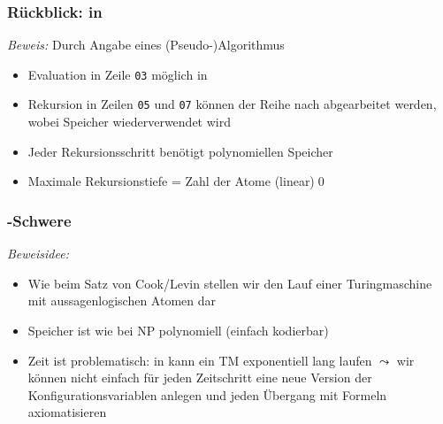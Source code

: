 \documentclass[aspectratio=1610,onlymath]{beamer}
\begin{document}
\begin{frame}\frametitle{Rückblick:  in \PSpace}

\pause

\emph{Beweis:} Durch Angabe eines (Pseudo-)Algorithmus

\smallskip

\begin{itemize}
\item Evaluation in Zeile \texttt{03} möglich in \PSpace
\item Rekursion in Zeilen \texttt{05} und \texttt{07} können der Reihe nach abgearbeitet werden, wobei Speicher wiederverwendet wird
\item Jeder Rekursionsschritt benötigt polynomiellen Speicher
\item Maximale Rekursionstiefe = Zahl der Atome (linear)\qed
\end{itemize}


\end{frame}

\begin{frame}\frametitle{\PSpace-Schwere}

\bigskip\pause

\pause

\emph{Beweisidee:}
\begin{itemize}
\item Wie beim Satz von Cook/Levin stellen wir den Lauf einer Turingmaschine
mit aussagenlogischen Atomen dar
\item Speicher ist wie bei NP polynomiell (einfach kodierbar)
\item Zeit ist problematisch: in \PSpace kann ein TM exponentiell lang laufen
$\leadsto$ wir können nicht einfach für jeden Zeitschritt eine neue Version
der Konfigurationsvariablen anlegen und jeden Übergang mit Formeln axiomatisieren
\end{itemize}

\end{frame}
\end{document}
